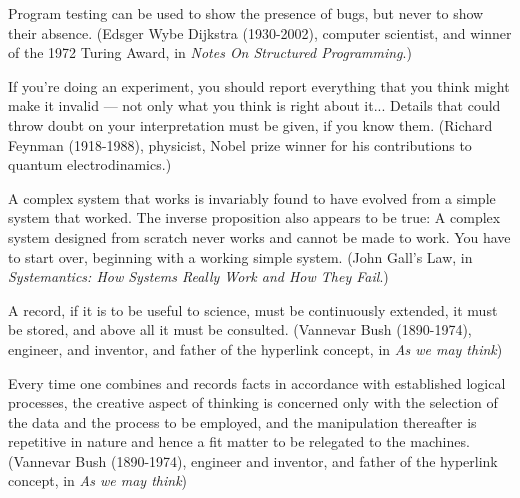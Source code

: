  Program testing can be used to show the presence of bugs, but
never to show their absence. (Edsger Wybe Dijkstra (1930-2002),
computer scientist, and winner of the 1972 Turing Award, in
\emph{Notes On Structured Programming}.)

 If you're doing an experiment, you should report everything
that you think might make it invalid — not only what you think
is right about it... Details that could throw doubt on your
interpretation must be given, if you know them. (Richard Feynman
(1918-1988), physicist, Nobel prize winner for his contributions
to quantum electrodinamics.)

 A complex system that works is invariably found to have evolved
from a simple system that worked. The inverse proposition also
appears to be true: A complex system designed from scratch never
works and cannot be made to work. You have to start over,
beginning with a working simple system. (John Gall's Law, in
\emph{Systemantics: How Systems Really Work and How They Fail}.)

 A record, if it is to be useful to science, must be
continuously extended, it must be stored, and above all it must
be consulted. (Vannevar Bush (1890-1974), engineer, and inventor,
and father of the hyperlink concept, in \emph{As we may think})

 Every time one combines and records facts in accordance with
established logical processes, the creative aspect of thinking
is concerned only with the selection of the data and the process
to be employed, and the manipulation thereafter is repetitive in
nature and hence a fit matter to be relegated to the machines.
(Vannevar Bush (1890-1974), engineer and inventor, and father of
the hyperlink concept, in \emph{As we may think})
